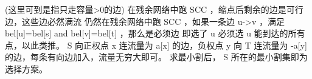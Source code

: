 {}(这里可到是指只走容量>0的边)\markdownRendererInterblockSeparator
{}
\markdownRendererSectionEnd \markdownRendererSectionBegin
{}\markdownRendererInterblockSeparator
{}在残余网络中跑\markdownRendererDollarSign{} SCC \markdownRendererDollarSign{}，缩点后剩余的边是可行边，这些边必然满流\markdownRendererInterblockSeparator
{}
\markdownRendererSectionEnd \markdownRendererSectionBegin
{}\markdownRendererInterblockSeparator
{}仍然在残余网络中跑\markdownRendererDollarSign{} SCC \markdownRendererDollarSign{}，如果一条边\markdownRendererDollarSign{} u->v \markdownRendererDollarSign{}，满足\markdownRendererDollarSign{} bel[u]=bel[s] \markdownRendererBackslash{} and\markdownRendererBackslash{}  bel[v]=bel[t] \markdownRendererDollarSign{}，那么是必须边\markdownRendererInterblockSeparator
{}
\markdownRendererSectionEnd \markdownRendererSectionBegin
{}\markdownRendererInterblockSeparator
{}即选了\markdownRendererDollarSign{} u \markdownRendererDollarSign{}必须选\markdownRendererDollarSign{} u \markdownRendererDollarSign{}能到达的所有点，以此类推。\markdownRendererParagraphSeparator
{}\markdownRendererDollarSign{} S \markdownRendererDollarSign{}向正权点\markdownRendererDollarSign{} x \markdownRendererDollarSign{}连流量为\markdownRendererDollarSign{} a[x] \markdownRendererDollarSign{}的边，负权点\markdownRendererDollarSign{} y \markdownRendererDollarSign{}向\markdownRendererDollarSign{} T \markdownRendererDollarSign{}连流量为\markdownRendererDollarSign{} -a[y] \markdownRendererDollarSign{}的边，每条有向边加入，流量无穷大即可。\markdownRendererParagraphSeparator
{}求最小割后，\markdownRendererDollarSign{} S \markdownRendererDollarSign{}所在的最小割集即为选择方案。\markdownRendererInterblockSeparator
{}
\markdownRendererSectionEnd \markdownRendererSectionBegin
{}\markdownRendererInterblockSeparator
